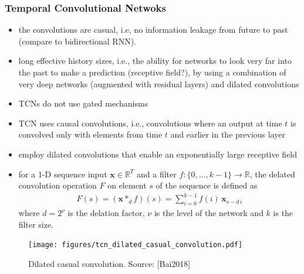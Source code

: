 \documentclass{article}
\begin{document}
\subsubsection{Temporal Convolutional Netwoks}

\begin{itemize}
\item the convolutions are casual, i.e, no information leakage from future to past (compare to bidirectional RNN).
\item long effective history sizes, i.e., the ability for networks to look very far into the past to make a prediction (receptive field?), by using a combination of very deep networks (augmented with residual layers) and dilated convolutions 
\item TCNs do not use gated mechanisms 
\item TCN uses causal convolutions, i.e., convolutions where an output at time $t$ is convolved only with elements from time $t$ and earlier in the previous layer 
\item employ dilated convolutions that enable an exponentially large receptive field
\item for a 1-D sequence input $\mathbf x \in \mathbb R^T$ and a filter $f:\{ 0, \dots, k-1\} \rightarrow \mathbb R$, the delated convolution operation $F$ on element $s$ of the sequence is defined as
\begin{align}
F(s) = (\mathbf x *_d f)(s) = \sum_{i=0}^{k-1} f(i) \, \mathbf x_{s-d\,i}
\end{align}
where $d = 2^\nu$ is the delation factor, $\nu$ is the level of the network and $k$ is the filter size.  
\end{itemize}
\begin{figure}[htbp]
	\centering
	\texttt{[image: figures/tcn\_dilated\_casual\_convolution.pdf]}
	\caption{Dilated casual convolution. Source: \cite{Bai2018}[Bai2018]}
	\label{fig:figure1}	
\end{figure}
\end{document}
